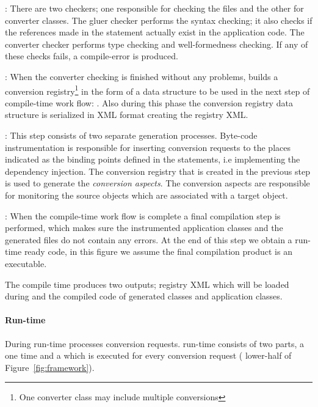 \begin{description}
\item{}: There are two checkers; one responsible for checking the \gluer files and the other for converter classes. The gluer checker performs the syntax checking; it also checks if the references made in the \gluer statement actually exist in the application code. The converter checker performs type checking and well-formedness checking. If any of these checks fails, a compile-error is produced. 
\item{}: When the converter checking is finished without any problems, \zamk builds a conversion registry\footnote{One converter class may include multiple conversions} in the form of a data structure to be used in the next step of compile-time work flow: . Also during this phase the conversion registry data structure is serialized in XML format creating the registry XML. 
\item{}: This step consists of two separate generation processes. Byte-code instrumentation is responsible for inserting \zamk conversion requests to the places indicated as the binding points defined in the \gluer statements, i.e implementing the dependency injection.
The conversion registry that is created in the previous step is used to generate the \emph{conversion aspects}.
The conversion aspects are responsible for monitoring the source objects which are associated with a target object. 
\item{}: When the compile-time work flow is complete a final compilation step is performed, which makes sure the instrumented application classes and the generated files do not contain any errors. At the end of this step we obtain a \zamk run-time ready code, in this figure we assume the final compilation product is an executable.
\end{description}
 
The \zamk compile time produces two outputs; registry XML which will be loaded during  and the compiled code of \zamk generated classes and application classes. 


\paragraph{Run-time}
During run-time \zamk processes conversion requests.
\zamk run-time consists of two parts, a one time  and a  which is executed for every conversion request (
lower-half of Figure~\ref{fig:framework}). 

